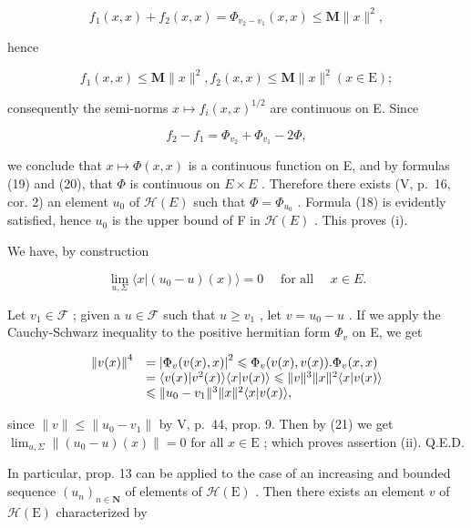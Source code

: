 \[
f _ {1} (x, x) + f _ {2} (x, x) = \Phi_ {v _ {2} - v _ {1}} (x, x) \leqslant \mathbf {M} \| x \| ^ {2},
\]

hence

\[
f _ {1} (x, x) \leqslant \mathbf {M} \| x \| ^ {2}, f _ {2} (x, x) \leqslant \mathbf {M} \| x \| ^ {2} (x \in \mathrm{E});
\]

consequently the semi-norms \(x \mapsto f_i(x, x)^{1/2}\) are continuous on E. Since

\[
f _ {2} - f _ {1} = \Phi_ {v _ {2}} + \Phi_ {v _ {1}} - 2 \Phi ,
\]

we conclude that \(x \mapsto \Phi(x, x)\) is a continuous function on E, and by formulas (19) and (20), that \(\Phi\) is continuous on \(E \times E\) . Therefore there exists (V, p.~16, cor. 2) an element \(u_{0}\) of \(\mathcal{H}(E)\) such that \(\Phi = \Phi_{u_{0}}\) . Formula (18) is evidently satisfied, hence \(u_{0}\) is the upper bound of F in \(\mathcal{H}(E)\) . This proves (i).

We have, by construction

\[
\lim _ {u, \Sigma} \langle x | (u _ {0} - u) (x) \rangle = 0 \quad \text { for   all } \quad x \in E.\tag{21}
\]

Let \(v_{1} \in \mathcal{F}\) ; given a \(u \in \mathcal{F}\) such that \(u \geqslant v_{1}\) , let \(v = u_{0} - u\) . If we apply the Cauchy-Schwarz inequality to the positive hermitian form \(\Phi_v\) on E, we get

\[
\begin{array}{r l} \left\| v (x) \right\| ^ {4} & = \left| \Phi_ {v} (v (x), x) \right| ^ {2} \leqslant \Phi_ {v} (v (x), v (x)). \Phi_ {v} (x, x) \\ & = \langle v (x) | v ^ {2} (x) \rangle \langle x | v (x) \rangle \leqslant \| v \| ^ {3} \| x \| ^ {2} \langle x | v (x) \rangle \\ & \leqslant \| u _ {0} - v _ {1} \| ^ {3} \| x \| ^ {2} \langle x | v (x) \rangle , \end{array}
\]

since \(\| v\| \leqslant \| u_0 - v_1\|\) by V, p.~44, prop. 9. Then by (21) we get \(\lim_{u,\Sigma}\left\| (u_0 - u)(x)\right\| = 0\) for all \(x\in \mathrm{E}\) ; which proves assertion (ii). Q.E.D.

In particular, prop. 13 can be applied to the case of an increasing and bounded sequence \((u_n)_{n\in \mathbf{N}}\) of elements of \(\mathcal{H}(\mathrm{E})\) . Then there exists an element \(v\) of \(\mathcal{H}(\mathrm{E})\) characterized by

